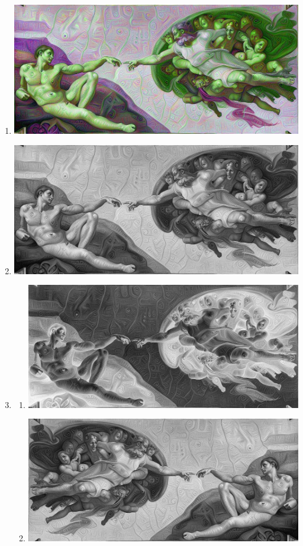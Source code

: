 \documentclass[man]{apa6}
\begin{document}
	\begin{enumerate}
		\item \includegraphics[width=\textwidth]{plots/2/swapImgPS0Q2.png}
		\item \includegraphics[width=\textwidth]{plots/2/grayImgPS0Q2.png}
		\item
			\begin{enumerate}	
				\item \includegraphics[width=\textwidth]{plots/2/negativeImgPS0Q2.png}
				\item \includegraphics[width=\textwidth]{plots/2/mirrorImgPS0Q2.png}

\end{enumerate}
\end{enumerate}
\end{document}
